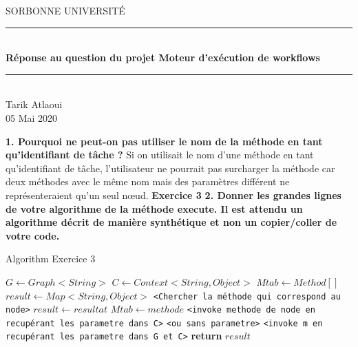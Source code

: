\documentclass{article}
\date{\today}
\author{Tarik Atlaoui}
\begin{document}
\makeatletter
\def\BState{\State\hskip-\ALG@thistlm}
\makeatother

\begin{titlepage}
	\enlargethispage{2cm}
	\newcommand{\HRule}{\rule{\linewidth}{0.5mm}}
	\center
	\textsc{\LARGE
	SORBONNE UNIVERSITÉ 
	} \\[1cm]
	\HRule \\[0.4cm]
	{ \huge \bfseries Réponse au question du projet Moteur d’exécution de workflows \\[0.15cm] }
	\HRule \\[4cm]
	\large{Tarik Atlaoui} \\[3cm]
	05 Mai 2020 \\[3cm]

\end{titlepage}
                                                                                                                         
\textbf{1. Pourquoi ne peut-on pas utiliser le nom de la méthode en tant qu’identifiant de tâche ?}
\newline
\newline
Si on utilisait le nom d'une méthode en tant qu'identifiant de tâche, l'utilisateur ne pourrait pas surcharger la méthode car deux méthodes avec le même nom mais des paramètres différent ne représenteraient qu'un seul nœud. 
\newline
\newline
\textbf{Exercice 3}
\newline
\textbf{2. Donner les grandes lignes de votre algorithme de la méthode execute. Il est attendu un
algorithme décrit de manière synthétique et non un copier/coller de votre code.}

\begin{algorithm}
  \caption{Algorithm Exercice 3}\label{euclid}
  \begin{algorithmic}[1]
      \State $G\gets Graph<String>$
      \State $C\gets Context<String , Object>$
      \State $Mtab\gets Method[]$
      \State $result\gets Map<String , Object>$
        \State \texttt{<Chercher la méthode qui correspond au node>}      
          \State $result\gets resultat$
          \State $Mtab\gets methode$
        \Else 
        \State \texttt{<invoke methode de node en recupérant les parametre dans C>}
        \State \texttt{<ou sans parametre>}
        \EndIf  
        \EndFor
        \State 
       
        \State \texttt{<invoke m en recupérant les parametre dans G et C>}
      \EndFor
      \State \textbf{return} $result$
    \EndProcedure
  \end{algorithmic}
\end{algorithm}
\end{document}
